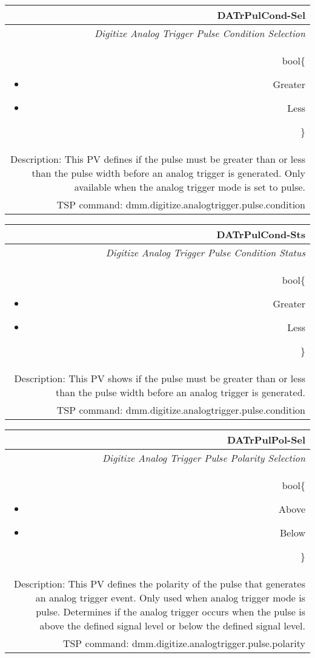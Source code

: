 \documentclass[openany]{article}
\begin{document}
		\begin{tabular}{N}
			\hline
			\bfseries DATrPulCond-Sel\label{pv:datrpulcond-sel} \\ \hline
			\emph{Digitize Analog Trigger Pulse Condition Selection} \\
			bool\{\begin{itemize}[noitemsep]
				\small
				\item[] Greater
				\item[] Less
			\end{itemize}\} \\
			Description: This PV defines if the pulse must be greater than or less than the pulse width before an analog trigger is generated. Only available when the analog trigger mode is set to pulse. \\
			TSP command: dmm.digitize.analogtrigger.pulse.condition
		\end{tabular}

		\begin{tabular}{N}
			\hline
			\bfseries DATrPulCond-Sts\label{pv:datrpulcond-sts} \\ \hline
			\emph{Digitize Analog Trigger Pulse Condition Status} \\
			bool\{\begin{itemize}[noitemsep]
				\small
				\item[] Greater
				\item[] Less
			\end{itemize}\} \\
			Description: This PV shows if the pulse must be greater than or less than the pulse width before an analog trigger is generated. \\
			TSP command: dmm.digitize.analogtrigger.pulse.condition
		\end{tabular}

		\begin{tabular}{N}
			\hline
			\bfseries DATrPulPol-Sel\label{pv:datrpulpol-sel} \\ \hline
			\emph{Digitize Analog Trigger Pulse Polarity Selection} \\
			bool\{\begin{itemize}[noitemsep]
				\small
				\item[] Above
				\item[] Below
			\end{itemize}\} \\
			Description: This PV defines the polarity of the pulse that generates an analog trigger event. Only used when analog trigger mode is pulse. Determines if the analog trigger occurs when the pulse is above the defined signal level or below the defined signal level. \\
			TSP command: dmm.digitize.analogtrigger.pulse.polarity
		\end{tabular}
\end{document}
